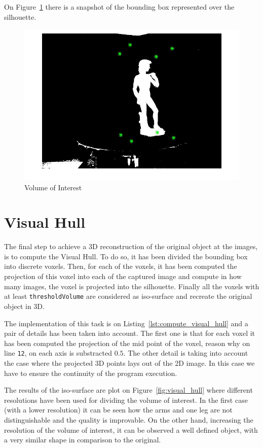 \documentclass{ethz_report}
\begin{document}
On Figure~\ref{fig:volume_of_interest} there is a snapshot of the bounding box represented over the silhouette.

\begin{figure}[H]
    \centering
    \includegraphics[width=.5\linewidth]{images/volume_of_interest}
    \caption{Volume of Interest}
    \label{fig:volume_of_interest}
\end{figure}

\section*{Visual Hull}

The final step to achieve a 3D reconstruction of the original object at the images, is to compute the Visual Hull. To do so, it has been divided the bounding box into discrete voxels. Then, for each of the voxels, it has been computed the projection of this voxel into each of the captured image and compute in how many images, the voxel is projected into the silhouette. Finally all the voxels with at least \texttt{thresholdVolume} are considered as iso-surface and recreate the original object in 3D.

The implementation of this task is on Listing~\ref{lst:compute_visual_hull} and a pair of details has been taken into account. The first one is that for each voxel it has been computed the projection of the mid point of the voxel, reason why on line \texttt{12}, on each axis is substracted $0.5$. The other detail is taking into account the case where the projected 3D points lays out of the 2D image. In this case we have to ensure the continuity of the program execution.



The results of the iso-surface are plot on Figure~\ref{fig:visual_hull} where different resolutions have been used for dividing the volume of interest.
In the first case (with a lower resolution) it can be seen how the arms and one leg are not distinguishable and the quality is improvable.
On the other hand, increasing the resolution of the volume of interest, it can be observed a well defined object, with a very similar shape in comparison to the original.
\end{document}
